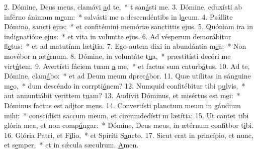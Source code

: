 2. Dómine, Deus meus, clamávi \uline{a}d te,~* t san\uline{á}sti me.
3. Dómine, eduxísti ab inférno ánimam m\uline{e}am:~* salvásti me a descendéntibs in l\uline{a}cum.
4. Psállite Dómino, sancti \uline{e}jus:~* et confitémini memóriæ sanctittis \uline{e}jus.
5. Quóniam ira in indignatióne \uline{e}jus:~* et vita in voluntte \uline{e}jus.
6. Ad vésperum demorábitur fl\uline{e}tus:~* et ad matutínm læt\uline{í}tia.
7. Ego autem dixi in abundántia m\uline{e}a:~* Non movébor n æt\uline{é}rnum.
8. Dómine, in voluntáte t\uline{u}a,~* præstitísti decóri me virt\uline{ú}tem.
9. Avertísti fáciem tuam \uline{a} me,~* et factus sum cnturb\uline{á}tus.
10. Ad te, Dómine, clam\uline{á}bo:~* et ad Deum meum dprec\uline{á}bor.
11. Quæ utílitas in sánguine m\uline{e}o,~* dum descéndo in corrpti\uline{ó}nem?
12. Numquid confitébitur tibi p\uline{u}lvis,~* aut annuntiábit verittem t\uline{u}am?
13. Audívit Dóminus, et misértus est m\uline{e}i:~* Dóminus factus est adjtor m\uline{e}us.
14. Convertísti planctum meum in gáudium m\uline{i}hi:~* conscidísti saccum meum, et circumdedísti m læt\uline{í}tia:
15. Ut cantet tibi glória mea, et non comp\uline{ú}ngar:~* Dómine, Deus meus, in ætérnum confitbor t\uline{i}bi.
16. Glória Patri, et F\uline{í}lio,~* et Spiríti S\uline{a}ncto.
17. Sicut erat in princípio, et nunc, et s\uline{e}mper,~* et in sǽcula sæculrum. \uline{A}men.

